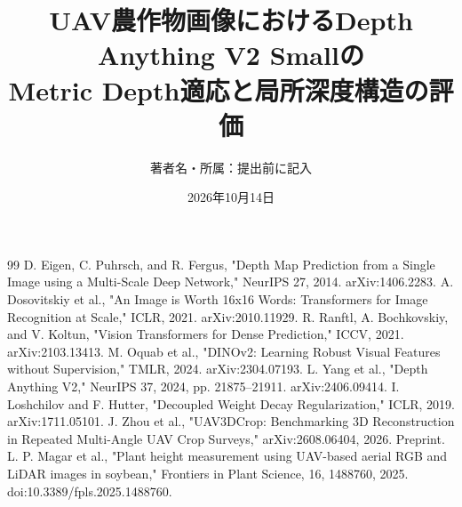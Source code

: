 \documentclass[a4paper,11pt,ja=standard,xelatex]{bxjsreport}
\title{UAV農作物画像におけるDepth Anything V2 Smallの\\Metric Depth適応と局所深度構造の評価}
\author{著者名・所属：提出前に記入}\date{2026年10月14日}
\begin{document}
\maketitle{}
\tableofcontents\listoffigures\listoftables
\clearpage{}




\appendix
\begin{thebibliography}{99}
 D. Eigen, C. Puhrsch, and R. Fergus, "Depth Map Prediction from a Single Image using a Multi-Scale Deep Network," NeurIPS 27, 2014. arXiv:1406.2283.
 A. Dosovitskiy et al., "An Image is Worth 16x16 Words: Transformers for Image Recognition at Scale," ICLR, 2021. arXiv:2010.11929.
 R. Ranftl, A. Bochkovskiy, and V. Koltun, "Vision Transformers for Dense Prediction," ICCV, 2021. arXiv:2103.13413.
 M. Oquab et al., "DINOv2: Learning Robust Visual Features without Supervision," TMLR, 2024. arXiv:2304.07193.
 L. Yang et al., "Depth Anything V2," NeurIPS 37, 2024, pp. 21875--21911. arXiv:2406.09414.
 I. Loshchilov and F. Hutter, "Decoupled Weight Decay Regularization," ICLR, 2019. arXiv:1711.05101.
 J. Zhou et al., "UAV3DCrop: Benchmarking 3D Reconstruction in Repeated Multi-Angle UAV Crop Surveys," arXiv:2608.06404, 2026. Preprint.
 L. P. Magar et al., "Plant height measurement using UAV-based aerial RGB and LiDAR images in soybean," Frontiers in Plant Science, 16, 1488760, 2025. doi:10.3389/fpls.2025.1488760.
\end{thebibliography}
\end{document}
